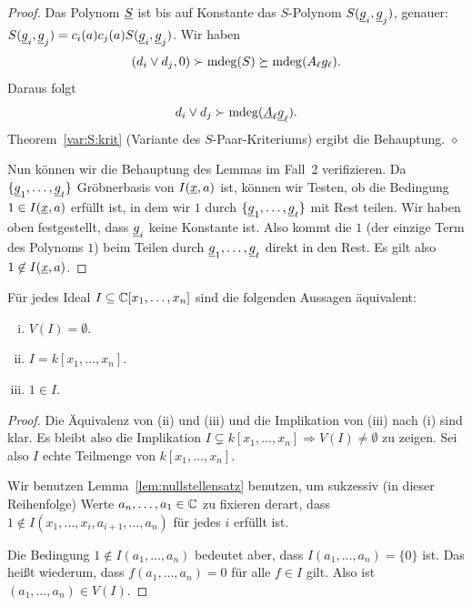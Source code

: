 \documentclass[11pt]{article}
\numberwithin{equation}{section}
\begin{document}
\begin{proof}
Das Polynom $\underline{S}$ ist bis auf Konstante das $S$-Polynom $S(\underline{g}_i, \underline{g}_j)$, genauer:  $S(\underline{g}_i, \underline{g}_j) = c_i(a) c_j(a) S(\underline{g}_i, \underline{g}_j)$. Wir haben 
\[
(d_i \vee d_j, 0) \succ \operatorname{mdeg}(S) \succeq \operatorname{mdeg}(A_\ell g_\ell). 
\]
Daraus folgt
\[
	d_i \vee d_j \succ \operatorname{mdeg}(\underline{A}_\ell \underline{g}_\ell). 
\]
Theorem~\ref{var:S:krit} (Variante des $S$-Paar-Kriteriums) ergibt  die Behauptung. 
\hfill$\diamond$ 

Nun können wir die Behauptung des Lemmas im Fall~2 verifizieren. Da $\{\underline{g}_1,\ldots,\underline{g}_t\}$ Gröbnerbasis von $I(\underline{x},a)$ ist, können wir Testen, ob die Bedingung $1 \in I(\underline{x},a)$ erfüllt ist, in dem wir $1$ durch $\{\underline{g}_1,\ldots,\underline{g}_t\}$ mit Rest teilen. Wir haben oben festgestellt, dass $\underline{g}_i$ keine Konstante ist. Also kommt die $1$ (der einzige Term des Polynoms $1$) beim Teilen durch $\underline{g}_1,\ldots,\underline{g}_t$ direkt in den Rest. Es gilt also $1 \not\in I(\underline{x},a)$. 
\end{proof} 

\begin{theorem} \label{schwacher:nullstellensatz}
	Für jedes Ideal $I \subseteq \mathbb{C}[x_1,\ldots,x_n]$ sind die folgenden Aussagen äquivalent: 
	\begin{enumerate}[(i)]
		\item $V(I) = \emptyset$. 
		\item $I = k[x_1,\ldots,x_n]$. 
		\item $1 \in I$. 
	\end{enumerate} 
\end{theorem} 
\begin{proof}
	Die Äquivalenz von (ii) und (iii) und die Implikation von (iii) nach (i) sind klar. Es bleibt also die Implikation $I \varsubsetneq k[x_1,\ldots,x_n] \Longrightarrow V(I) \ne \emptyset$ zu zeigen. Sei also $I$ echte Teilmenge von $k[x_1,\ldots,x_n]$. 
		
	Wir benutzen Lemma~\ref{lem:nullstellensatz} benutzen, um sukzessiv (in dieser Reihenfolge) Werte $a_n,\ldots,a_1 \in \mathbb{C}$ zu fixieren derart, dass  $1 \not\in I(x_1,\ldots,x_i,a_{i+1},\ldots,a_n)$ für jedes $i$ erfüllt ist. 
	
	Die Bedingung $1 \not\in I(a_1,\ldots,a_n)$ bedeutet aber, dass $I(a_1,\ldots,a_n) = \{0\}$ ist. Das heißt wiederum, dass $f(a_1,\ldots,a_n) = 0$ für alle $f \in I$ gilt. Also ist $(a_1,\ldots,a_n) \in V(I)$. 
\end{proof} 
\end{document}
